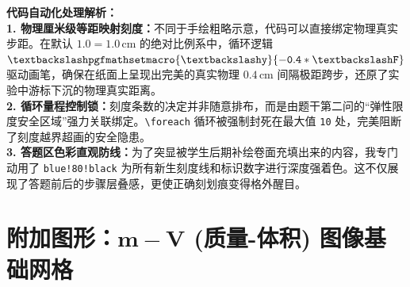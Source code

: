 \documentclass[12pt, a4paper]{ctexrep}
\begin{document}
\vspace{0.6cm}

{\small\color{blue!70!black}
\textbf{代码自动化处理解析：}\\
\textbf{1. 物理厘米级等距映射刻度：}不同于手绘粗略示意，代码可以直接绑定物理真实步距。在默认 $1.0 = 1.0\,\text{cm}$ 的绝对比例系中，循环逻辑 $\mathtt{\textbackslash pgfmathsetmacro\{\textbackslash y\}\{-0.4 * \textbackslash F\}}$ 驱动画笔，确保在纸面上呈现出完美的真实物理 $0.4\,\text{cm}$ 间隔极距跨步，还原了实验中游标下沉的物理真实距离。\\
\textbf{2. 循环量程控制锁：}刻度条数的决定并非随意排布，而是由题干第二问的“弹性限度安全区域”强力关联绑定。\texttt{\textbackslash foreach} 循环被强制封死在最大值 \texttt{10} 处，完美阻断了刻度越界超画的安全隐患。\\
\textbf{3. 答题区色彩直观防线：}为了突显被学生后期补绘卷面充填出来的内容，我专门动用了 \texttt{blue!80!black} 为所有新生刻度线和标识数字进行深度强着色。这不仅展现了答题前后的步骤层叠感，更使正确刻划痕变得格外醒目。
}


\section{附加图形：$\boldsymbol{m-V}$ (质量-体积) 图像基础网格}

\vspace{0.6cm}
\end{document}
